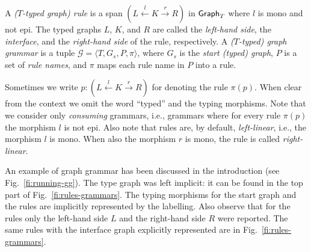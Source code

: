 \begin{definition} 
  A \emph{($T$-typed graph) rule} is a span
  $(L \stackrel{l}{\leftarrow} K \stackrel{r}{\rightarrow} R)$ in
  $\mathsf{Graph}_{T}$ where $l$ is mono and not epi.
  The typed graphs $L$, $K$, and $R$ are called the \emph{left-hand side},
  the \emph{interface}, and the \emph{right-hand side} of the rule, respectively. 
  A \emph{($T$-typed) graph grammar} is a tuple
  $\mathcal{G} = \langle T, G_s, P, \pi \rangle$, where $G_s$ is the
  \emph{start (typed) graph}, $P$ is a 
  set of \emph{rule names}, and
  $\pi$ maps each rule name in $P$ into a rule.
\end{definition}
%
Sometimes we write
$p:(L \stackrel{l}{\leftarrow} K \stackrel{r}{\rightarrow} R)$ for
%
denoting the rule $\pi(p)$.  When clear from the context we omit the
word ``typed'' and the typing morphisms.  Note that we consider only
\emph{consuming} grammars, i.e., grammars where for every rule
$\pi(p)$
the morphism $l$ is not epi.  
%
Also note that rules are, by default, \emph{left-linear}, i.e., the morphism
$l$ is mono. When also the morphism $r$ is mono, the rule is called
\emph{right-linear}.


An example of graph grammar has been discussed in the introduction
(see Fig.~\ref{fi:running-gg}). The type graph was left implicit: it
can be found in the top part of Fig.~\ref{fi:rules-grammars}. The
typing morphisms for the start graph and the rules are implicitly
represented by the labelling. Also observe that for the rules only the
left-hand side $L$ and the right-hand side $R$ were reported. The same
rules with the interface graph explicitly represented are in
Fig.~\ref{fi:rules-grammars}.

